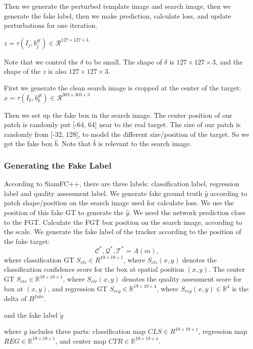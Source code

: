 \documentclass{article}
\begin{document}
Then we generate the perturbed template image and search image, then we generate the fake label, then we make prediction, calculate loss, and update perturbations for one iteration.

$z = \tau (I_j, b^{gt}_j)\in \mathcal{R}^{127\times 127\times 3}$

Note that we control the $\delta$ to be small. The shape of $\delta$ is $127 \times 127 \times 3$, and the shape of the $z$ is also $127 \times 127 \times 3$.

First we generate the clean search image is cropped at the center of the target:$x = \tau(I_k, b_{k}^{gt})\in \mathcal{R}^{303\times 303 \times 3}$

Then we set up the fake box in the search image. The center position of our patch is randomly put [-64, 64] near to the real target. The size of our patch is randomly from [-32, 128], to model the different size/position of the target. So we get the fake box $\hat b$. Note that $\hat b$ is relevant to the search image.

\subsubsection{Generating the Fake Label}

According to SiamFC++, there are three labels: classification label, regression label and quality assessment label.
We generate fake ground truth $\hat y$ according to patch shape/position on the search image  used for calculate loss.
We use the position of this fake GT to generate the $\hat y$.
We need the network prediction close to the FGT.
Calculate the FGT box position on the search image, according to the scale.
We generate the fake label of the tracker according to the position of the fake target:
\begin{equation}
\mathcal{C^*, Q^*, T^*} = A(m),
\end{equation}
where classification GT $S_{cls} \in R^{19 \times 19 \times 1}$, where $S_{cls}(x,y)$ denotes the classification confidence score for the box at spatial position $(x,y)$. The center GT $S_{ctr} \in \mathbb{R}^{19 \times 19 \times 1}$, where $S_{ctr}(x,y)$ denotes the quality assessment score for box at $(x,y)$, and regression GT $S_{reg} \in \mathbb{R}^{19 \times 19 \times 4}$, where $S_{reg}(x,y) \in \mathbb R^{4}$ is the delta of $B^{fake}$.

and the fake label $\tilde y$

where $y$ includes three parts: classification map $CLS \in R^{19 \times 19 \times 1}$, regression map $REG \in \mathbb{R}^{19 \times 19 \times 1}$, and center map $CTR \in \mathbb{R}^{19 \times 19 \times 4}$.
\end{document}
